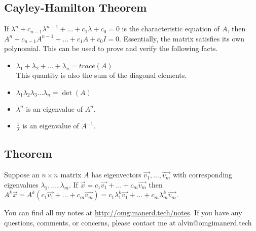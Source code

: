 \documentclass{math}
\begin{document}
\subsection*{Cayley-Hamilton Theorem}
If \( \lambda^n+c_{n-1}\lambda^{n-1}+\dots+c_1\lambda+c_0 = 0 \) is the
characteristic equation of \( A \), then \( A^n+c_{n-1}A^{n-1}+\dots+
c_1A+c_0I = 0 \). Essentially, the matrix satisfies its own polynomial. This can
be used to prove and verify the following facts.
\begin{itemize}
  \item \( \lambda_1+\lambda_2+\dots+\lambda_n = trace(A) \) \\
    This quantity is also the sum of the diagonal elements.
  \item \( \lambda_1\lambda_2\lambda_3\dots\lambda_n = \det(A) \)
  \item \( \lambda^n \) is an eigenvalue of \( A^n \).
  \item \( \frac{1}{\lambda} \) is an eigenvalue of \( A^{-1} \).
\end{itemize}

\subsection*{Theorem}
Suppose an \( n\times n \) matrix \( A \) has eigenvectors \( \vec{v_1},\dots,
\vec{v_m} \) with corresponding eigenvalues \( \lambda_1,\dots,\lambda_m \).
If \( \vec{x} = c_1\vec{v_1}+\dots+c_m\vec{v_m} \) then \( A^k\vec{x} = A^k
(c_1\vec{v_1}+\dots+c_m\vec{v_m}) = c_1\lambda_1^k\vec{v_1}+
\dots+c_m\lambda_m^k\vec{v_m} \).

\begin{center}
  You can find all my notes at \url{http://omgimanerd.tech/notes}. If you have
  any questions, comments, or concerns, please contact me at
  alvin@omgimanerd.tech
\end{center}
\end{document}

